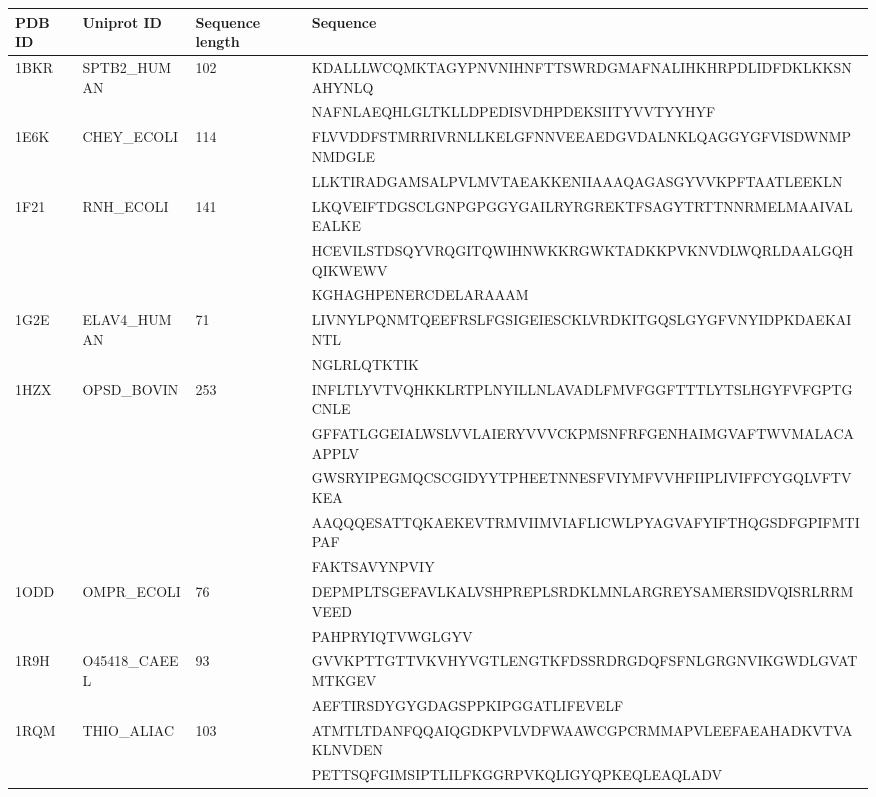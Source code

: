 \documentclass{bioinfo}
\begin{document}
\begin{table}[!t]
{\begin{tabular}{llll}\toprule
    PDB ID & Uniprot ID   & Sequence length & Sequence \\\midrule
    1BKR   & SPTB2\_HUMAN & 102 & KDALLLWCQMKTAGYPNVNIHNFTTSWRDGMAFNALIHKHRPDLIDFDKLKKSNAHYNLQ \\
	~&~&~& NAFNLAEQHLGLTKLLDPEDISVDHPDEKSIITYVVTYYHYF \\
    1E6K   & CHEY\_ECOLI  & 114 & FLVVDDFSTMRRIVRNLLKELGFNNVEEAEDGVDALNKLQAGGYGFVISDWNMPNMDGLE \\
	~&~&~& LLKTIRADGAMSALPVLMVTAEAKKENIIAAAQAGASGYVVKPFTAATLEEKLN           \\
    1F21   & RNH\_ECOLI   & 141 & LKQVEIFTDGSCLGNPGPGGYGAILRYRGREKTFSAGYTRTTNNRMELMAAIVALEALKE \\
	~&~&~& HCEVILSTDSQYVRQGITQWIHNWKKRGWKTADKKPVKNVDLWQRLDAALGQHQIKWEWV \\
	~&~&~& KGHAGHPENERCDELARAAAM            \\
    1G2E   & ELAV4\_HUMAN & 71  & LIVNYLPQNMTQEEFRSLFGSIGEIESCKLVRDKITGQSLGYGFVNYIDPKDAEKAINTL \\
	~&~&~& NGLRLQTKTIK            \\
    1HZX   & OPSD\_BOVIN  & 253 & INFLTLYVTVQHKKLRTPLNYILLNLAVADLFMVFGGFTTTLYTSLHGYFVFGPTGCNLE \\
	~&~&~& GFFATLGGEIALWSLVVLAIERYVVVCKPMSNFRFGENHAIMGVAFTWVMALACAAPPLV \\
	~&~&~& GWSRYIPEGMQCSCGIDYYTPHEETNNESFVIYMFVVHFIIPLIVIFFCYGQLVFTVKEA \\
	~&~&~& AAQQQESATTQKAEKEVTRMVIIMVIAFLICWLPYAGVAFYIFTHQGSDFGPIFMTIPAF \\
	~&~&~& FAKTSAVYNPVIY            \\
    1ODD   & OMPR\_ECOLI  & 76 & DEPMPLTSGEFAVLKALVSHPREPLSRDKLMNLARGREYSAMERSIDVQISRLRRMVEED \\
	~&~&~& PAHPRYIQTVWGLGYV             \\
    1R9H   & O45418\_CAEEL & 93 & GVVKPTTGTTVKVHYVGTLENGTKFDSSRDRGDQFSFNLGRGNVIKGWDLGVATMTKGEV \\
	~&~&~& AEFTIRSDYGYGDAGSPPKIPGGATLIFEVELF              \\
    1RQM   & THIO\_ALIAC  & 103 & ATMTLTDANFQQAIQGDKPVLVDFWAAWCGPCRMMAPVLEEFAEAHADKVTVAKLNVDEN \\
	~&~&~& PETTSQFGIMSIPTLILFKGGRPVKQLIGYQPKEQLEAQLADV            \\

\end{tabular}}
\end{table}
\end{document}
